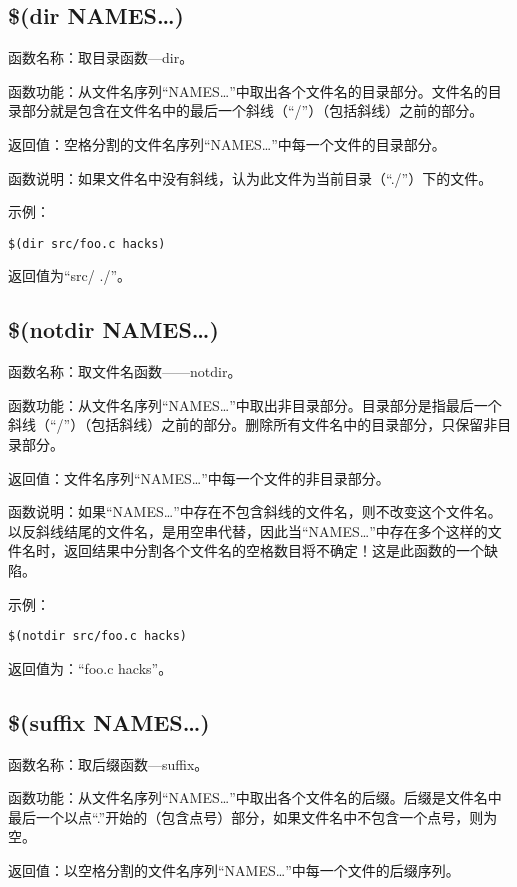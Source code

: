 \subsection{\$(dir NAMES…)}

函数名称：取目录函数—dir。

函数功能：从文件名序列“NAMES…”中取出各个文件名的目录部分。文件名的目录部分就是包含在文件名中的最后一个斜线（“/”）（包括斜线）之前的部分。

返回值：空格分割的文件名序列“NAMES…”中每一个文件的目录部分。

函数说明：如果文件名中没有斜线，认为此文件为当前目录（“./”）下的文件。

示例：
\begin{Verbatim}[]
$(dir src/foo.c hacks)
\end{Verbatim}

返回值为“src/ ./”。

\subsection{\$(notdir NAMES…)}

函数名称：取文件名函数——notdir。

函数功能：从文件名序列“NAMES…”中取出非目录部分。目录部分是指最后一个斜线（“/”）（包括斜线）之前的部分。删除所有文件名中的目录部分，只保留非目录部分。

返回值：文件名序列“NAMES…”中每一个文件的非目录部分。

函数说明：如果“NAMES…”中存在不包含斜线的文件名，则不改变这个文件名。以反斜线结尾的文件名，是用空串代替，因此当“NAMES…”中存在多个这样的文件名时，返回结果中分割各个文件名的空格数目将不确定！这是此函数的一个缺陷。

示例：
\begin{Verbatim}[]
$(notdir src/foo.c hacks)
\end{Verbatim}

返回值为：“foo.c hacks”。

\subsection{\$(suffix NAMES…)}

函数名称：取后缀函数—suffix。

函数功能：从文件名序列“NAMES…”中取出各个文件名的后缀。后缀是文件名中最后一个以点“.”开始的（包含点号）部分，如果文件名中不包含一个点号，则为空。

返回值：以空格分割的文件名序列“NAMES…”中每一个文件的后缀序列。

